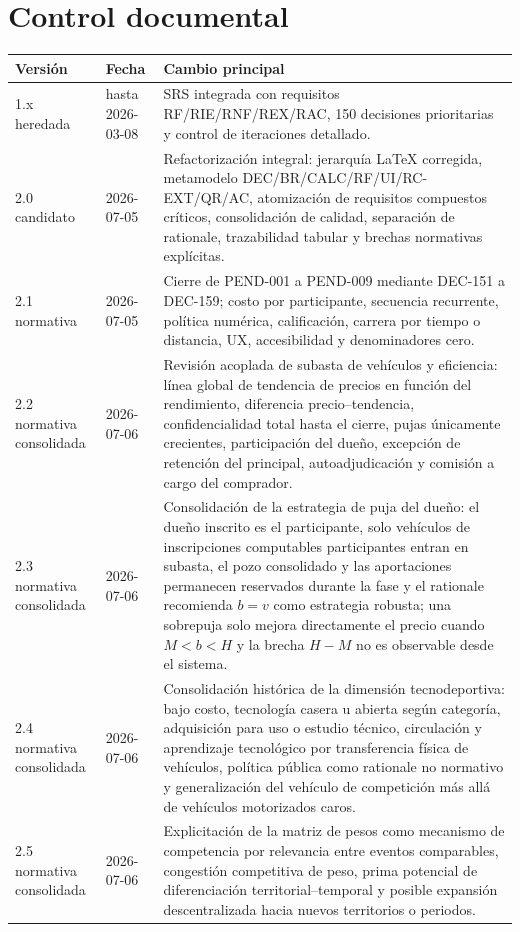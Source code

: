 \documentclass[10pt,letterpaper]{article}
\begin{document}
\section{Control documental}
\begin{longtable}{P{2.0cm}P{2.6cm}P{8.8cm}}
\toprule
\textbf{Versión} & \textbf{Fecha} & \textbf{Cambio principal}\\
\midrule
1.x heredada & hasta 2026-03-08 & SRS integrada con requisitos RF/RIE/RNF/REX/RAC, 150 decisiones prioritarias y control de iteraciones detallado.\\
2.0 candidato & 2026-07-05 & Refactorización integral: jerarquía LaTeX corregida, metamodelo DEC/BR/CALC/RF/UI/RC-EXT/QR/AC, atomización de requisitos compuestos críticos, consolidación de calidad, separación de rationale, trazabilidad tabular y brechas normativas explícitas.\\
2.1 normativa & 2026-07-05 & Cierre de PEND-001 a PEND-009 mediante DEC-151 a DEC-159; costo por participante, secuencia recurrente, política numérica, calificación, carrera por tiempo o distancia, UX, accesibilidad y denominadores cero.\\
2.2 normativa consolidada & 2026-07-06 & Revisión acoplada de subasta de vehículos y eficiencia: línea global de tendencia de precios en función del rendimiento, diferencia precio--tendencia, confidencialidad total hasta el cierre, pujas únicamente crecientes, participación del dueño, excepción de retención del principal, autoadjudicación y comisión a cargo del comprador.\\
2.3 normativa consolidada & 2026-07-06 & Consolidación de la estrategia de puja del dueño: el dueño inscrito es el participante, solo vehículos de inscripciones computables participantes entran en subasta, el pozo consolidado y las aportaciones permanecen reservados durante la fase y el rationale recomienda $b=v$ como estrategia robusta; una sobrepuja solo mejora directamente el precio cuando $M<b<H$ y la brecha $H-M$ no es observable desde el sistema.\\
2.4 normativa consolidada & 2026-07-06 & Consolidación histórica de la dimensión tecnodeportiva: bajo costo, tecnología casera u abierta según categoría, adquisición para uso o estudio técnico, circulación y aprendizaje tecnológico por transferencia física de vehículos, política pública como rationale no normativo y generalización del vehículo de competición más allá de vehículos motorizados caros.\\
2.5 normativa consolidada & 2026-07-06 & Explicitación de la matriz de pesos como mecanismo de competencia por relevancia entre eventos comparables, congestión competitiva de peso, prima potencial de diferenciación territorial--temporal y posible expansión descentralizada hacia nuevos territorios o periodos.\\

\end{longtable}
\end{document}
